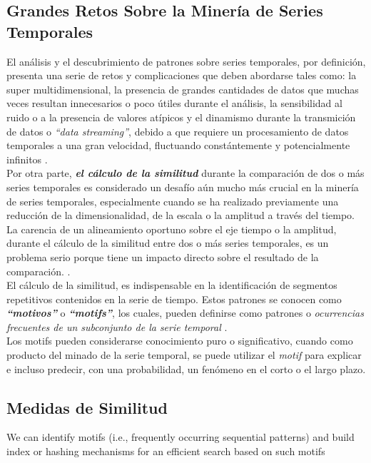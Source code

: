 \subsection{Grandes Retos Sobre la Miner\'ia de Series Temporales}
El an\'alisis y el descubrimiento de patrones sobre series temporales, por definici\'on, presenta una serie de retos y complicaciones que deben abordarse tales como: la super multidimensional, la presencia de grandes cantidades de datos que muchas veces resultan innecesarios o poco \'utiles durante el an\'alisis, la sensibilidad al ruido o a la presencia de valores at\'ipicos y el dinamismo durante la transmici\'on de datos o \textit{\enquote{data streaming}}, debido a que requiere un procesamiento de datos temporales a una gran velocidad, fluctuando const\'antemente y potencialmente infinitos \cite{main}.\\
Por otra parte, \textit{\textbf{el c\'alculo de la similitud}} durante la comparaci\'on de dos o m\'as series temporales es considerado un desaf\'io a\'un mucho m\'as crucial en la miner\'ia de series temporales, especialmente cuando se ha realizado previamente una reducci\'on de la dimensionalidad, de la escala o la amplitud a trav\'es del tiempo. La carencia de un alineamiento oportuno sobre el eje tiempo o la amplitud, durante el c\'alculo de la similitud entre dos o m\'as series temporales, es un problema serio porque tiene un impacto directo sobre el resultado de la comparaci\'on. \cite{concepts}.\\
El c\'alculo de la similitud, es indispensable en la identificaci\'on de segmentos repetitivos contenidos en la serie de tiempo. Estos patrones se conocen como \textit{\textbf{\enquote{motivos}}} o \textit{\textbf{\enquote{motifs}}}, los cuales, pueden definirse como patrones o \textit{ocurrencias frecuentes de un subconjunto de la serie temporal} \cite{main}.\\
Los motifs pueden considerarse conocimiento puro o significativo, cuando como producto del minado de la serie temporal, se puede utilizar el \textit{motif} para explicar e incluso predecir, con una probabilidad, un fen\'omeno en el corto o el largo plazo.
\subsection{Medidas de Similitud}
 We can identify motifs (i.e., frequently occurring
sequential patterns) and build index or hashing mechanisms for an efficient search
based on such motifs









